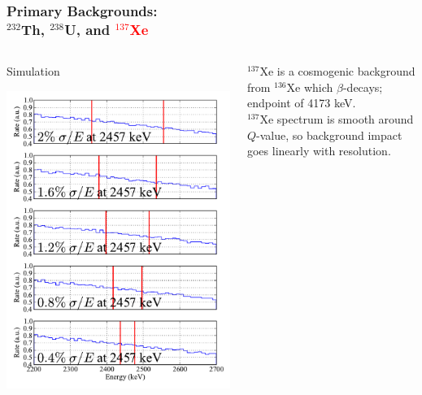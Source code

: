 \documentclass{beamer}
\begin{document}
\begin{frame}
\begin{center}
\frametitle{\hfill Primary Backgrounds:\\\hfill $^{232}$Th, $^{238}$U, and \textcolor{red}{$^{137}$Xe}}
\end{center}
\begin{columns}[T]
\begin{column}{.59\textwidth}
\vspace{-1cm}%
\begin{center}
Simulation
\end{center}
\vspace{-0.3cm}%
\includegraphics[keepaspectratio=true,width=\textwidth]{Xe_Spectra_vs_Res.pdf}
\end{column}
\begin{column}{.41\textwidth}
\vspace{.5cm}%

$^{137}$Xe is a cosmogenic background from $^{136}$Xe which $\beta$-decays; endpoint of 4173 keV.\\[\baselineskip]

$^{137}$Xe spectrum is smooth around $Q$-value, so background impact goes linearly with resolution.

\end{column}
\end{columns}
\end{frame}
\end{document}
